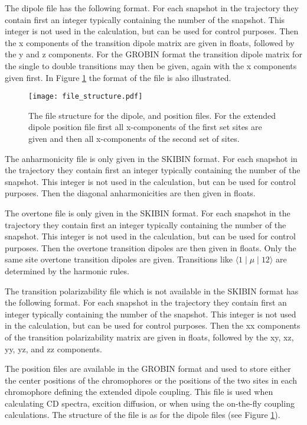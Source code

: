 The dipole file has the following format.
For each snapshot in the trajectory they contain first an integer typically containing the number of the snapshot. This integer is not used in the calculation, but can be used for control purposes.
Then the x components of the transition dipole matrix are given in floats, followed by the y and z components. For the GROBIN format the transition dipole matrix for the single to double transitions may then be given, again with the x components given first. In Figure \ref{fig:filestructure} the format of the file is also illustrated.
\begin{figure}[!ht]
\begin{center}
\texttt{[image: file\_structure.pdf]}
\end{center}
\caption{\label{fig:filestructure}The file structure for the dipole, and position files. For the extended dipole position file first all x-components of the first set sites are given and then all x-components of the second set of sites.}
\end{figure}

The anharmonicity file is only given in the SKIBIN format.
For each snapshot in the trajectory they contain first an integer typically containing the number of the snapshot. This integer is not used in the calculation, but can be used for control purposes.
Then the diagonal anharmonicities are then given in floats.

The overtone file is only given in the SKIBIN format.
For each snapshot in the trajectory they contain first an integer typically containing the number of the snapshot. This integer is not used in the calculation, but can be used for control purposes.
Then the overtone transition dipoles are then given in floats. Only the same site overtone transition dipoles are given. Transitions like $\langle 1\mid\mu\mid 12\rangle$ are determined by the harmonic rules.

The transition polarizability file which is not available in the SKIBIN format 
has the following format. For each snapshot in the trajectory they contain first an integer 
typically containing the number of the snapshot. This integer is not used in the calculation, 
but can be used for control purposes. Then the xx components of the transition polarizability
matrix are given in floats, followed by the xy, xz, yy, yz, and zz components. 

The position files are available in the GROBIN format and used to store either the center positions of the chromophores or the positions of the two sites in each chromophore defining the extended dipole coupling. This file is used when calculating CD spectra, excition diffusion, or when using the on-the-fly coupling calculations. The structure of the file is as for the dipole files (see Figure \ref{fig:filestructure}).

